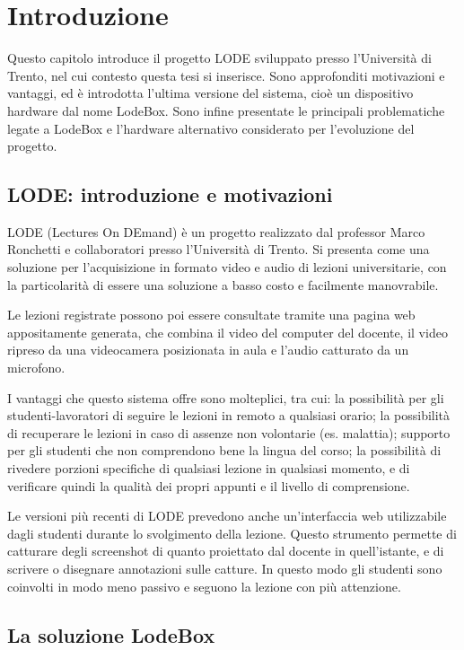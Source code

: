 \chapter{Introduzione}
\label{cha:intro}

Questo capitolo introduce il progetto LODE sviluppato presso l'Università di Trento, nel cui contesto questa tesi si inserisce. Sono approfonditi motivazioni e vantaggi, ed è introdotta l'ultima versione del sistema, cioè un dispositivo hardware dal nome LodeBox. Sono infine presentate le principali problematiche legate a LodeBox e l'hardware alternativo considerato per l'evoluzione del progetto.

\section{LODE: introduzione e motivazioni}
\label{sec:intro_lode}

LODE (Lectures On DEmand) è un progetto realizzato dal professor Marco Ronchetti e collaboratori presso l'Università di Trento. Si presenta come una soluzione per l'acquisizione in formato video e audio di lezioni universitarie, con la particolarità di essere una soluzione a basso costo e facilmente manovrabile.\cite{ronchetti}

Le lezioni registrate possono poi essere consultate tramite una pagina web appositamente generata, che combina il video del computer del docente, il video ripreso da una videocamera posizionata in aula e l'audio catturato da un microfono.

I vantaggi che questo sistema offre sono molteplici, tra cui: la possibilità per gli studenti-lavoratori di seguire le lezioni in remoto a qualsiasi orario; la possibilità di recuperare le lezioni in caso di assenze non volontarie (es. malattia); supporto per gli studenti che non comprendono bene la lingua del corso; la possibilità di rivedere porzioni specifiche di qualsiasi lezione in qualsiasi momento, e di verificare quindi la qualità dei propri appunti e il livello di comprensione.

Le versioni più recenti di LODE prevedono anche un'interfaccia web utilizzabile dagli studenti durante lo svolgimento della lezione. Questo strumento permette di catturare degli screenshot di quanto proiettato dal docente in quell'istante, e di scrivere o disegnare annotazioni sulle catture. In questo modo gli studenti sono coinvolti in modo meno passivo e seguono la lezione con più attenzione.

\section{La soluzione LodeBox}
\label{sec:intro_lodebox}

